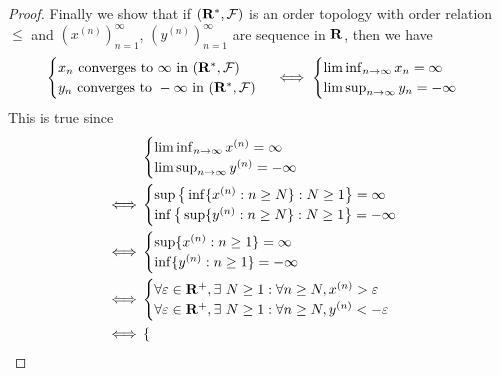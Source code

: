 \begin{proof}
  Finally we show that if  \((\mathbf{R}^*, \mathcal{F})\) is an order topology with order relation \(\leq\) and \((x^{(n)})_{n = 1}^\infty\), \((y^{(n)})_{n = 1}^\infty\) are sequence in \(\mathbf{R}\), then we have
  \[
    \begin{cases}
      x_n \text{ converges to } \infty \text{ in } (\mathbf{R}^*, \mathcal{F})  \\
      y_n \text{ converges to } -\infty \text{ in } (\mathbf{R}^*, \mathcal{F}) \\
    \end{cases} \iff \begin{cases}
      \liminf_{n \to \infty} x_n = \infty \\
      \limsup_{n \to \infty} y_n = -\infty
    \end{cases}
  \]
  This is true since
  \begin{align*}
         & \begin{cases}
             \liminf_{n \to \infty} x^{(n)} = \infty \\
             \limsup_{n \to \infty} y^{(n)} = -\infty
           \end{cases}                                                                                       \\
    \iff & \begin{cases}
             \sup\big\{\inf\{x^{(n)} : n \geq N\} : N \geq 1\big\} = \infty \\
             \inf\big\{\sup\{y^{(n)} : n \geq N\} : N \geq 1\big\} = -\infty
           \end{cases}                                                                \\
    \iff & \begin{cases}
             \sup\{x^{(n)} : n \geq 1\} = \infty \\
             \inf\{y^{(n)} : n \geq 1\} = -\infty
           \end{cases}                                                                                           \\
    \iff & \begin{cases}
             \forall \varepsilon \in \mathbf{R}^+, \exists\ N \geq 1 : \forall n \geq N, x^{(n)} > \varepsilon \\
             \forall \varepsilon \in \mathbf{R}^+, \exists\ N \geq 1 : \forall n \geq N, y^{(n)} < -\varepsilon
           \end{cases}                                     \\
    \iff & \begin{cases}

\end{cases}
\end{align*}
\end{proof}
